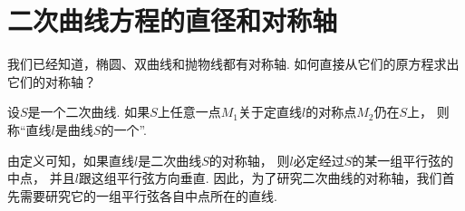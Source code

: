 \section{二次曲线方程的直径和对称轴}
我们已经知道，椭圆、双曲线和抛物线都有对称轴.
如何直接从它们的原方程求出它们的对称轴？

\begin{definition}
设\(S\)是一个二次曲线.
如果\(S\)上任意一点\(M_1\)关于定直线\(l\)的对称点\(M_2\)仍在\(S\)上，
则称“直线\(l\)是曲线\(S\)的一个”.
\end{definition}

由定义可知，如果直线\(l\)是二次曲线\(S\)的对称轴，
则\(l\)必定经过\(S\)的某一组平行弦的中点，
并且\(l\)跟这组平行弦方向垂直.
因此，为了研究二次曲线的对称轴，我们首先需要研究它的一组平行弦各自中点所在的直线.

